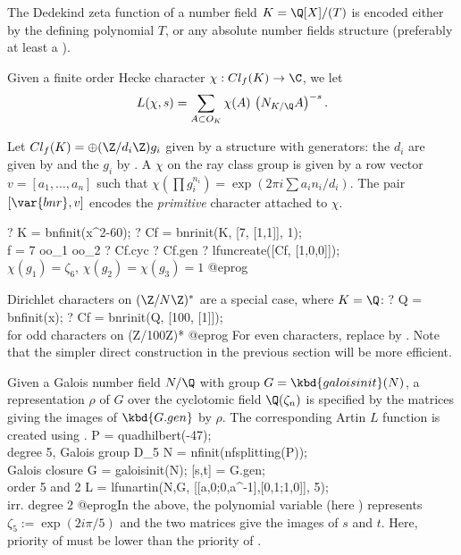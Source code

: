 
The Dedekind zeta function of a number field $K = \Q[X]/(T)$ is encoded
either by the defining polynomial $T$, or any absolute number fields
structure (preferably at least a ).

Given a finite order Hecke character $\chi: Cl_f(K)\to \C$, we let
$$L(\chi, s) = \sum_{A \subset O_K} \chi(A)\, \left(N_{K/\Q}A\right)^{-s}.$$

Let $Cl_f(K) = \oplus (\Z/d_i\Z) g_i$ given by a  structure with
generators: the $d_i$ are given by  and the $g_i$ by .
A  $\chi$ on the ray class group is given by a row vector
$v = [a_1,\ldots,a_n]$ such that $\chi(\prod g_i^{n_i}) = \exp(2\pi i\sum
a_i n_i / d_i)$. The pair $[\var{bnr}, v]$ encodes the \emph{primitive}
character attached to $\chi$.

\bprog
? K  = bnfinit(x^2-60);
? Cf = bnrinit(K, [7, [1,1]], 1); \\ f = 7 oo_1 oo_2
? Cf.cyc
? Cf.gen
? lfuncreate([Cf, [1,0,0]]); \\$\chi(g_1) = \zeta_6$, $\chi(g_2)=\chi(g_3)=1$
@eprog

\noindent Dirichlet characters on $(\Z/N\Z)^*$ are a special case,
where $K = \Q$:
\bprog
? Q  = bnfinit(x);
? Cf = bnrinit(Q, [100, [1]]); \\ for odd characters on (Z/100Z)*
@eprog\noindent
For even characters, replace by . Note that the simpler
direct construction in the previous section will be more efficient.


Given a Galois number field $N/\Q$ with group $G = \kbd{galoisinit}(N)$,
a representation $\rho$ of $G$ over the cyclotomic field $\Q(\zeta_n)$
is specified by the matrices giving the images of $\kbd{G.gen}$ by $\rho$.
The corresponding Artin $L$ function is created using .
\bprog
   P = quadhilbert(-47); \\  degree 5, Galois group D_5
   N = nfinit(nfsplitting(P)); \\ Galois closure
   G = galoisinit(N);
   [s,t] = G.gen; \\ order 5 and 2
   L = lfunartin(N,G, [[a,0;0,a^-1],[0,1;1,0]], 5); \\ irr. degree 2
@eprog\noindent In the above, the polynomial variable (here ) represents
$\zeta_5 := \exp(2i\pi/5)$ and the two matrices give the images of
$s$ and $t$. Here, priority of  must be lower than the priority
of .


